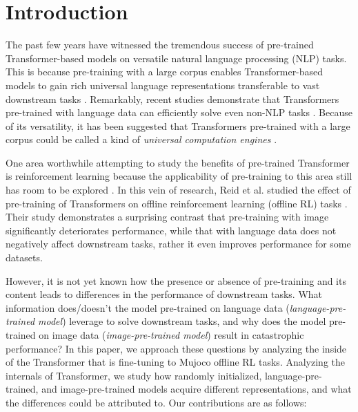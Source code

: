 \section{Introduction}
\label{section:introduction}

The past few years have witnessed the tremendous success of pre-trained Transformer-based models \cite{vaswani2017attention} on versatile natural language processing (NLP) tasks. This is because pre-training with a large corpus enables Transformer-based models to gain rich universal language representations transferable to vast downstream tasks \cite{devlin2018bert,radford2019language,brown2020language}. Remarkably, recent studies demonstrate that Transformers pre-trained with language data can efficiently solve even non-NLP tasks \cite{lu2021pretrained,noorbakhsh2021pretrained,li2022pre,huang2022language,reid2022can,tam2022semantic}. Because of its versatility, it has been suggested that Transformers pre-trained with a large corpus could be called a kind of \textit{universal computation engines} \cite{lu2021pretrained}. 

One area worthwhile attempting to study the benefits of pre-trained Transformer is reinforcement learning because the applicability of pre-training to this area still has room to be explored \cite{singh2020parrot,yang2021representation,stooke2021decoupling}. In this vein of research, Reid et al. studied the effect of pre-training of Transformers on offline reinforcement learning (offline RL) tasks \cite{reid2022can}. Their study demonstrates a surprising contrast that pre-training with image significantly deteriorates performance, while that with language data does not negatively affect downstream tasks, rather it even improves performance for some datasets. 

However, it is not yet known how the presence or absence of pre-training and its content leads to differences in the performance of downstream tasks. What information does/doesn't the model pre-trained on language data (\textit{language-pre-trained model}) leverage to solve downstream tasks, and why does the model pre-trained on image data (\textit{image-pre-trained model}) result in catastrophic performance? In this paper, we approach these questions by analyzing the inside of the Transformer that is fine-tuning to Mujoco \cite{todorov2012mujoco} offline RL tasks. Analyzing the internals of Transformer, we study how randomly initialized, language-pre-trained, and image-pre-trained models acquire different representations, and what the differences could be attributed to. Our contributions are as follows:

